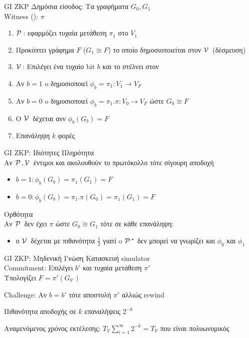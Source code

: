 \documentclass[10pt,handout]{beamer}
\begin{document}
\begin{frame}{GI ZKP}
	Δημόσια είσοδος: Τα γραφήματα $G_0,G_1$\\
	Witness (\prv): $\pi$
	\begin{enumerate}
	   \setlength \itemsep{0.1em}
	   \item $\mathcal{P}\,$: εφαρμόζει τυχαία μετάθεση $\pi_1$ στο $V_1$ 
	   \item Προκύπτει γράφημα $F$ ($G_1 \cong F$) το οποίο δημοσιοποιείται στον $\mathcal{V}\,$ (δέσμευση) \pause
	   \item $\mathcal{V}\,$: Eπιλέγει ένα τυχαίο bit $b$ και το στέλνει στον \prv \pause
	   \item  Αν $b=1$ o \prv δημοσιοποιεί $\phi_b = \pi_1: V_1 \rightarrow V_F$
	   \item  Αν $b=0$ o \prv δημοσιοποιεί $\phi_b = \pi_1 . \pi: V_0 \rightarrow V_F$ ώστε $G_0 \cong F$ \pause
	   \item O $\mathcal{V}\,$ δέχεται ανν $\phi_b(G_b) = F$
	   \item Επανάληψη $k$ φορές 
   \end{enumerate}	
\end{frame}

\begin{frame}{GI ZKP: Ιδιότητες}
	Πληρότητα\\
	Αν $\mathcal{P}\,, \mathcal{V}\,$ έντιμοι και ακολουθούν το πρωτόκολλο τότε σίγουρη αποδοχή
	\begin{itemize}
		\item $b=1: \phi_b(G_b) = \pi_1(G_1) = F$
		\item $b=0: \phi_b(G_b) = \pi_1 . \pi(G_0) = \pi_1(G_1) = F$
	\end{itemize} \pause
	Ορθότητα\\
	Αν $\mathcal{P}\,$ δεν έχει $\pi$ ώστε $G_0 \cong G_1$ τότε σε κάθε επανάληψη:
	\begin{itemize}
		\item ο $\mathcal{V}\,$ δέχεται με πιθανότητα $\frac{1}{2}$ γιατί o $\mathcal{P}\,^*$ δεν μπορεί να γνωρίζει και $\phi_0$ και $\phi_1$
	\end{itemize}   
\end{frame} 

\begin{frame}{GI ZKP: Μηδενική Γνώση}
	Κατασκευή simulator \siml \\ \pause 
	Commitment: Επιλέγει $b'$ και τυχαία μετάθεση $\pi'$ \\ \pause 
	Υπολογίζει $F = \pi'(G_{b'})$

	Challenge: Αν $b=b'$ τότε αποστολή $\pi'$ αλλιώς rewind

	Πιθανότητα αποδοχής σε $k$ επαναλήψεις $2^{-k}$

	Αναμενόμενος χρόνος εκτέλεσης: $T_V \sum_{i=1}^{\infty} 2^{-k} = T_V$ που είναι πολυωνυμικός
\end{frame}
\end{document}
